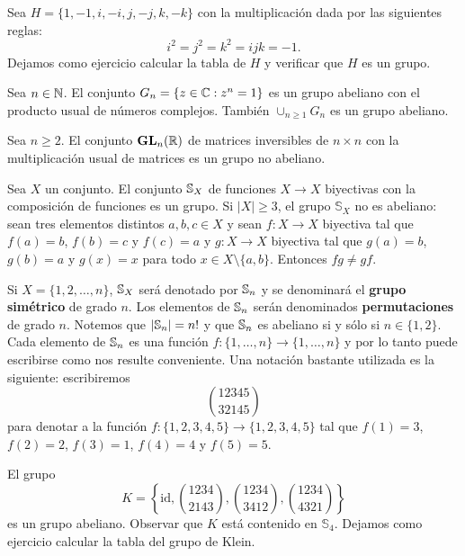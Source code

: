\begin{example}
Sea $H=\{1,-1,i,-i,j,-j,k,-k\}$ con la multiplicación dada por las siguientes reglas:
\[
i^2=j^2=k^2=ijk=-1.
\]
Dejamos como ejercicio calcular la tabla de $H$ y verificar que $H$ es un grupo. 
\end{example}

\begin{example}
	Sea $n\in\mathbb{N}$. El conjunto $G_n=\{z\in\mathbb{C}:z^n=1\}$ es un grupo abeliano con
	el producto usual de números complejos.	También 
	$\cup_{n\geq1}G_n$ es un grupo abeliano.
\end{example}

\begin{example}
	Sea $n\geq2$.  El conjunto $\mathbf{GL}_n(\mathbb{R})$ de matrices inversibles de $n\times
	n$ con la multiplicación usual de matrices es un grupo no abeliano. 
\end{example}

\begin{example}
	Sea $X$ un conjunto. El conjunto $\mathbb{S}_X$ de funciones $X\to X$ biyectivas
	con la composición de funciones es un grupo.  Si $|X|\geq3$, el grupo
	$\mathbb{S}_{X}$ no es abeliano: sean tres elementos distintos $a,b,c\in
	X$ y sean $f\colon X\to X$ biyectiva tal que $f(a)=b$, $f(b)=c$ y $f(c)=a$ y $g\colon X\to
	X$ biyectiva tal que $g(a)=b$, $g(b)=a$ y $g(x)=x$ para todo $x\in
	X\setminus\{a,b\}$.  Entonces $fg\ne gf$. 
\end{example}

Si $X=\{1,2,\dots,n\}$, $\mathbb{S}_X$ será denotado por $\mathbb{S}_n$ y se denominará el
\textbf{grupo simétrico} de grado $n$. Los elementos de $\mathbb{S}_n$ serán 
denominados \textbf{permutaciones} de grado $n$. 
Notemos que $|\mathbb{S}_n|=n!$ y que $\mathbb{S}_n$
es abeliano si y sólo si $n\in\{1,2\}$. Cada elemento de $\mathbb{S}_n$ es una función
$f\colon\{1,\dots,n\}\to \{1,\dots,n\}$ y por lo tanto puede escribirse como nos resulte conveniente. 
Una notación bastante utilizada es la siguiente: escribiremos
\[
\binom{12345}{32145}
\]
para denotar a la
función $f\colon\{1,2,3,4,5\}\to\{1,2,3,4,5\}$ tal que
$f(1)=3$, $f(2)=2$, $f(3)=1$, $f(4)=4$ y $f(5)=5$. 

\begin{example}
El grupo 
\[
K=\left\{ \mathrm{id},\binom{1234}{2143},\binom{1234}{3412},\binom{1234}{4321}\right\} 
\]
es un grupo abeliano. Observar que $K$ está contenido en $\mathbb{S}_{4}$. 
Dejamos como ejercicio calcular la tabla del grupo de Klein. 
\end{example}

